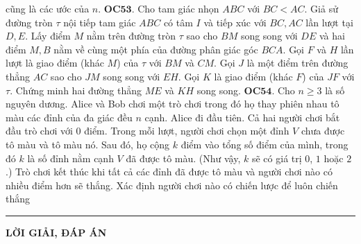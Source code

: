 \begin{multicols}{2}
	cũng là các ước của $n.$
	\vskip 0.1cm
	{\bf\color{cackithi} OC$\pmb{53.}$} Cho tam giác nhọn $ABC$ với $BC < AC$. Giả sử đường tròn $\tau$ nội tiếp tam giác $ABC$ có tâm $I$ và tiếp xúc với $BC, AC$ lần lượt tại $D, E.$ Lấy điểm $M$ nằm trên đường tròn $\tau$  sao cho $BM$ song song với $DE$ và hai điểm $M, B$  nằm về cùng một phía của đường phân giác góc $BCA.$ Gọi $F$ và $H$ lần lượt là giao điểm (khác $M$) của $\tau$ với $BM$ và $CM.$  Gọi $J$ là một điểm trên đường thẳng $AC$ sao cho $JM$ song song với $EH$. Gọi $K$ là giao điểm (khác $F$) của $JF$ với $\tau.$ 
	Chứng minh hai đường thẳng $ME$ và $KH$ song song.
	\vskip 0.1cm
	{\bf\color{cackithi} OC$\pmb{54.}$} Cho $n \ge 3$ là số nguyên dương. Alice và Bob  chơi một trò chơi trong đó họ thay phiên nhau tô màu các đỉnh của đa giác đều $n$ cạnh. Alice đi đầu tiên. Cả hai người chơi bắt đầu trò chơi với $0$ điểm. Trong mỗi lượt, người chơi chọn một đỉnh $V$ chưa được tô màu và tô màu nó. Sau đó, họ cộng $k$ điểm vào tổng số điểm của mình, trong đó $k$ là số đỉnh nằm cạnh  $V$ đã được tô màu. (Như vậy, $k$ sẽ có giá trị $0$, $1$ hoặc $2$.)
	Trò chơi kết thúc khi tất cả các đỉnh đã được tô màu và người chơi nào có nhiều điểm hơn sẽ thắng. Xác định người chơi nào có chiến lược để luôn chiến thắng
\end{multicols}
\vspace*{-10pt}
{\color{cackithi}\rule{1\linewidth}{1pt}}
\vskip 0.2cm
\centerline{\Large{\textbf{\color{cackithi}LỜI GIẢI, ĐÁP ÁN}}}
\vskip 0.1cm
